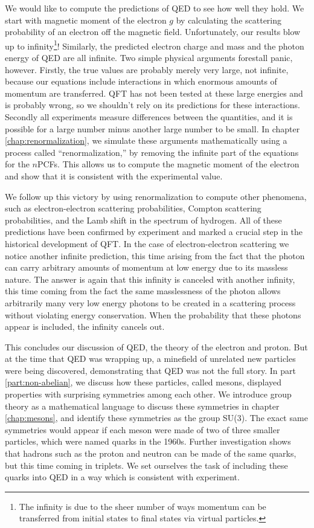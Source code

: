 We would like to compute the predictions of QED to see how well they hold. We start with magnetic moment of the electron $g$ by calculating the scattering probability of an electron off the magnetic field. Unfortunately, our results blow up to infinity\footnote{The infinity is due to the sheer number of ways momentum can be transferred from initial states to final states via virtual particles.}! Similarly, the predicted electron charge and mass and the photon energy of QED are all infinite. Two simple physical arguments forestall panic, however. Firstly, the true values are probably merely very large, not infinite, because our equations include interactions in which enormous amounts of momentum are transferred. QFT has not been tested at these large energies and is probably wrong, so we shouldn't rely on its predictions for these interactions. Secondly all experiments measure differences between the quantities, and it is possible for a large number minus another large number to be small. In chapter \ref{chap:renormalization}, we simulate these arguments mathematically using a process called ``renormalization,'' by removing the infinite part of the equations for the $n$PCFs. This allows us to compute the magnetic moment of the electron and show that it is consistent with the experimental value.

We follow up this victory by using renormalization to compute other phenomena, such as electron-electron scattering probabilities, Compton scattering probabilities, and the Lamb shift in the spectrum of hydrogen. All of these predictions have been confirmed by experiment and marked a crucial step in the historical development of QFT. In the case of electron-electron scattering we notice another infinite prediction, this time arising from the fact that the photon can carry arbitrary amounts of momentum at low energy due to its massless nature. The answer is again that this infinity is canceled with another infinity, this time coming from the fact the same masslessness of the photon allows arbitrarily many very low energy photons to be created in a scattering process without violating energy conservation. When the probability that these photons appear is included, the infinity cancels out.

This concludes our discussion of QED, the theory of the electron and proton. But at the time that QED was wrapping up, a minefield of unrelated new particles were being discovered, demonstrating that QED was not the full story. In part \ref{part:non-abelian}, we discuss how these particles, called mesons, displayed properties with surprising symmetries among each other. We introduce group theory as a mathematical language to discuss these symmetries in chapter \ref{chap:mesons}, and identify these symmetries as the group SU(3). The exact same symmetries would appear if each meson were made of two of three smaller particles, which were named quarks in the 1960s. Further investigation shows that hadrons such as the proton and neutron can be made of the same quarks, but this time coming in triplets. We set ourselves the task of including these quarks into QED in a way which is consistent with experiment.


